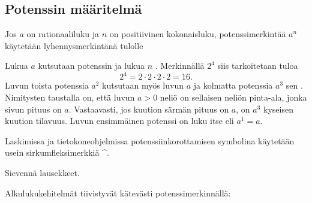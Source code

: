 \subsection{Potenssin määritelmä}

Jos $a$ on rationaaliluku ja $n$ on positiivinen kokonaisluku, potenssimerkintää $a^n$ käytetään lyhennysmerkintänä tulolle
   
\laatikko[Potenssi]{    \[
        a^n = \underbrace{a\cdot \ldots \cdot a}_{n\text{ kpl}}. 
    \]}
    
Lukua $a$ kutsutaan potenssin  ja lukua $n$ . Merkinnällä $2^4$ siis tarkoitetaan tuloa 
        \[
            2^4=2\cdot 2\cdot 2\cdot 2=16.
        \]
Luvun toista potenssia $a^2$ kutsutaan myös luvun $a$  ja kolmatta potenssia $a^3$ sen . Nimitysten taustalla on, että luvun $a>0$ neliö on sellaisen neliön pinta-ala, jonka sivun pituus on $a$. Vastaavasti, jos kuution särmän pituus on $a$, on $a^3$ kyseisen kuution tilavuus. Luvun ensimmäinen potenssi on luku itse eli $a^1 = a$.

Laskimissa ja tietokoneohjelmissa potenssiinkorottamisen symbolina käytetään usein sirkumfleksimerkkiä \^{}.

\begin{esimerkki}
Sievennä lausekkeet.
	\begin{esimratk}
	
	\end{esimratk}
	
	\begin{esimvast}
	\end{esimvast}
\end{esimerkki}

\begin{esimerkki} %
Alkulukukehitelmät tiivistyvät kätevästi potenssimerkinnällä:
\end{esimerkki}

